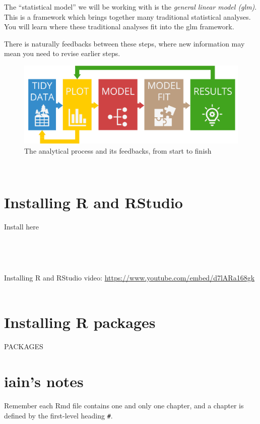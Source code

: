 \documentclass[
]{book}
\begin{document}
The ``statistical model'' we will be working with is the
\emph{general linear model (glm)}. This is a framework which brings together
many traditional statistical analyses. You will learn where these traditional
analyses fit into the glm framework.

There is naturally feedbacks between these steps, where new information may
mean you need to revise earlier steps.\\
\hspace*{0.333em}

\begin{figure}
\centering
\includegraphics{Process.png}
\caption{The analytical process and its feedbacks, from start to finish}
\end{figure}

~

\hypertarget{installing-r-and-rstudio}{%
\section{Installing R and RStudio}\label{installing-r-and-rstudio}}

Install here

~

~

Installing R and RStudio video: \url{https://www.youtube.com/embed/d7lARa168gk}
~

\hypertarget{installing-r-packages}{%
\section{Installing R packages}\label{installing-r-packages}}

PACKAGES

\hypertarget{iains-notes}{%
\section{iain's notes}\label{iains-notes}}

Remember each Rmd file contains one and only one chapter, and a chapter is defined by the first-level heading \texttt{\#}.
\end{document}
